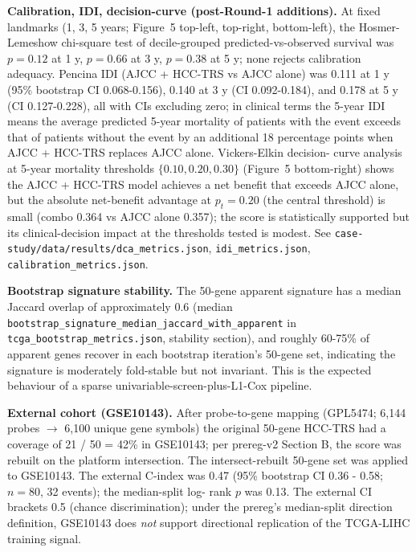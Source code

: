 \documentclass[12pt]{article}
\newcommand{\HCCRTS}{HCC-TRS\xspace}
\begin{document}
\textbf{Calibration, IDI, decision-curve (post-Round-1 additions).}
At fixed landmarks (1, 3, 5 years; Figure~5 top-left, top-right,
bottom-left), the Hosmer-Lemeshow chi-square test of decile-grouped
predicted-vs-observed survival was $p = 0.12$ at 1 y, $p = 0.66$ at
3 y, $p = 0.38$ at 5 y; none rejects calibration adequacy. Pencina
IDI (AJCC + \HCCRTS vs AJCC alone) was 0.111 at 1 y (95\% bootstrap
CI 0.068-0.156), 0.140 at 3 y (CI 0.092-0.184), and 0.178 at 5 y (CI
0.127-0.228), all with CIs excluding zero; in clinical terms the
5-year IDI means the average predicted 5-year mortality of patients
with the event exceeds that of patients without the event by an
additional 18 percentage points when AJCC + \HCCRTS replaces AJCC
alone. Vickers-Elkin decision-
curve analysis at 5-year mortality thresholds $\{0.10, 0.20, 0.30\}$
(Figure~5 bottom-right) shows the AJCC + \HCCRTS model achieves a
net benefit that exceeds AJCC alone, but the absolute net-benefit
advantage at $p_t = 0.20$ (the central threshold) is small (combo
0.364 vs AJCC alone 0.357); the score is statistically supported
but its clinical-decision impact at the thresholds tested is
modest. See \texttt{case-study/data/results/dca\_metrics.json},
\texttt{idi\_metrics.json}, \texttt{calibration\_metrics.json}.

\textbf{Bootstrap signature stability.} The 50-gene apparent
signature has a median Jaccard overlap of approximately 0.6 (median
\texttt{bootstrap\_signature\_median\_jaccard\_with\_apparent} in
\texttt{tcga\_bootstrap\_metrics.json}, stability section), and
roughly 60-75\% of apparent genes recover in each bootstrap
iteration's 50-gene set, indicating the signature is moderately
fold-stable but not invariant. This is the expected behaviour of a
sparse univariable-screen-plus-L1-Cox pipeline.

\textbf{External cohort (GSE10143).}
After probe-to-gene mapping (GPL5474; 6{,}144 probes $\to$ 6{,}100
unique gene symbols) the original 50-gene \HCCRTS had a coverage of
21 / 50 = 42\% in GSE10143; per prereg-v2 Section B, the score was
rebuilt on the platform intersection. The intersect-rebuilt 50-gene
set was applied to GSE10143. The external C-index was 0.47 (95\%
bootstrap CI 0.36 - 0.58; $n = 80$, 32 events); the median-split log-
rank $p$ was 0.13. The external CI brackets 0.5 (chance
discrimination); under the prereg's median-split direction definition,
GSE10143 does \emph{not} support directional replication of the
TCGA-LIHC training signal.
\end{document}
